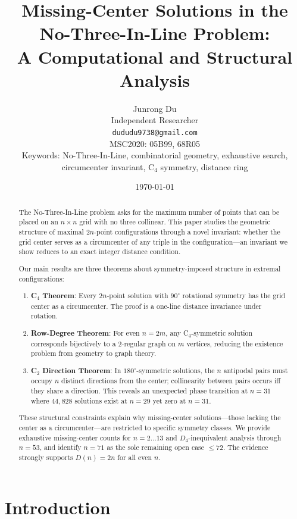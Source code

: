 \documentclass[11pt,a4paper]{article}
\title{\vspace{-1.5cm}\textbf{Missing-Center Solutions in the\\No-Three-In-Line Problem:\\
A Computational and Structural Analysis}}
\author{Junrong Du\\
\small Independent Researcher\\
\small \texttt{dududu9738@gmail.com}\\[4pt]
\small MSC2020: 05B99, 68R05\\
\small Keywords: No-Three-In-Line, combinatorial geometry, exhaustive search,\\
\small \hspace*{1.85cm}circumcenter invariant, C$_4$ symmetry, distance ring}
\date{\small \today}
\theoremstyle{plain}
\theoremstyle{definition}
\begin{document}
\maketitle
\thispagestyle{firstpage}

\begin{abstract}
The No-Three-In-Line problem asks for the maximum number of points that can be placed on an $n\times n$ grid with no three collinear. This paper studies the geometric structure of maximal $2n$-point configurations through a novel invariant: whether the grid center serves as a circumcenter of any triple in the configuration---an invariant we show reduces to an exact integer distance condition.

Our main results are three theorems about symmetry-imposed structure in extremal configurations:

\begin{enumerate}[nosep]
\item \textbf{C$_4$ Theorem}: Every $2n$-point solution with $90^\circ$ rotational symmetry has the grid center as a circumcenter. The proof is a one-line distance invariance under rotation.
\item \textbf{Row-Degree Theorem}: For even $n=2m$, any C$_4$-symmetric solution corresponds bijectively to a $2$-regular graph on $m$ vertices, reducing the existence problem from geometry to graph theory.
\item \textbf{C$_2$ Direction Theorem}: In $180^\circ$-symmetric solutions, the $n$ antipodal pairs must occupy $n$ distinct directions from the center; collinearity between pairs occurs iff they share a direction. This reveals an unexpected phase transition at $n=31$ where $44{,}828$ solutions exist at $n=29$ yet zero at $n=31$.
\end{enumerate}

These structural constraints explain why missing-center solutions---those lacking the center as a circumcenter---are restricted to specific symmetry classes. We provide exhaustive missing-center counts for $n=2\dots13$ and $D_4$-inequivalent analysis through $n=53$, and identify $n=71$ as the sole remaining open case $\le 72$. The evidence strongly supports $D(n)=2n$ for all even $n$.
\end{abstract}

\section{Introduction}
\label{sec:intro}
\end{document}
